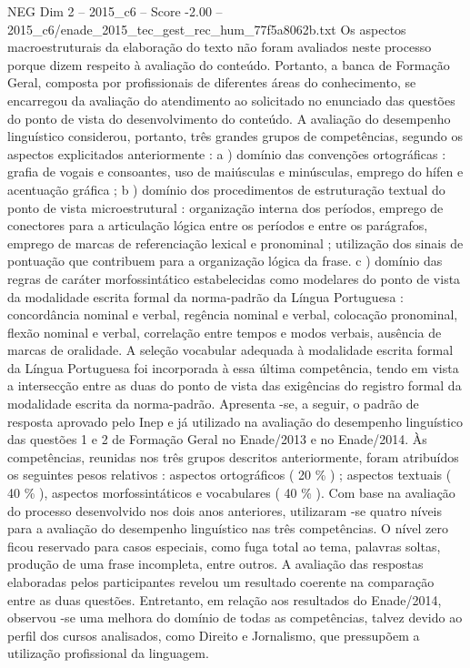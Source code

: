 \begin{textsample}{NEG Dim 2 – 2015\_c6 – Score -2.00 – 2015\_c6/enade\_2015\_tec\_gest\_rec\_hum\_77f5a8062b.txt}
Os aspectos macroestruturais da elaboração do texto não foram avaliados neste processo porque dizem respeito à avaliação do conteúdo.
Portanto, a banca de Formação Geral, composta por profissionais de diferentes áreas do conhecimento, se encarregou da avaliação do atendimento ao solicitado no enunciado das questões do ponto de vista do desenvolvimento do conteúdo.
A avaliação do desempenho linguístico considerou, portanto, três grandes grupos de competências, segundo os aspectos explicitados anteriormente : a ) domínio das convenções ortográficas : grafia de vogais e consoantes, uso de maiúsculas e minúsculas, emprego do hífen e acentuação gráfica ; b ) domínio dos procedimentos de estruturação textual do ponto de vista microestrutural : organização interna dos períodos, emprego de conectores para a articulação lógica entre os períodos e entre os parágrafos, emprego de marcas de referenciação lexical e pronominal ; utilização dos sinais de pontuação que contribuem para a organização lógica da frase. c ) domínio das regras de caráter morfossintático estabelecidas como modelares do ponto de vista da modalidade escrita formal da norma-padrão da Língua Portuguesa : concordância nominal e verbal, regência nominal e verbal, colocação pronominal, flexão nominal e verbal, correlação entre tempos e modos verbais, ausência de marcas de oralidade.
A seleção vocabular adequada à modalidade escrita formal da Língua Portuguesa foi incorporada à essa última competência, tendo em vista a intersecção entre as duas do ponto de vista das exigências do registro formal da modalidade escrita da norma-padrão.
Apresenta -se, a seguir, o padrão de resposta aprovado pelo Inep e já utilizado na avaliação do desempenho linguístico das questões 1 e 2 de Formação Geral no Enade/2013 e no Enade/2014.
Às competências, reunidas nos três grupos descritos anteriormente, foram atribuídos os seguintes pesos relativos : aspectos ortográficos ( 20 \% ) ; aspectos textuais ( 40 \% ), aspectos morfossintáticos e vocabulares ( 40 \% ).
Com base na avaliação do processo desenvolvido nos dois anos anteriores, utilizaram -se quatro níveis para a avaliação do desempenho linguístico nas três competências.
O nível zero ficou reservado para casos especiais, como fuga total ao tema, palavras soltas, produção de uma frase incompleta, entre outros.
A avaliação das respostas elaboradas pelos participantes revelou um resultado coerente na comparação entre as duas questões.
Entretanto, em relação aos resultados do Enade/2014, observou -se uma melhora do domínio de todas as competências, talvez devido ao perfil dos cursos analisados, como Direito e Jornalismo, que pressupõem a utilização profissional da linguagem.

\end{textsample}
